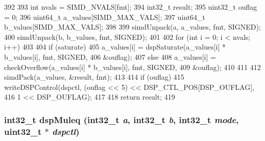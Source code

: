 \begin{DoxyCode}
392 {
393     int nvals = SIMD_NVALS[fmt];
394     int32_t result;
395     uint32_t ouflag = 0;
396     uint64_t a_values[SIMD_MAX_VALS];
397     uint64_t b_values[SIMD_MAX_VALS];
398 
399     simdUnpack(a, a_values, fmt, SIGNED);
400     simdUnpack(b, b_values, fmt, SIGNED);
401 
402     for (int i = 0; i < nvals; i++)
403     {
404         if (saturate)
405             a_values[i] = dspSaturate(a_values[i] * b_values[i], fmt, SIGNED,
406                                       &ouflag);
407         else
408             a_values[i] = checkOverflow(a_values[i] * b_values[i], fmt, SIGNED,
409                                         &ouflag);
410     }
411 
412     simdPack(a_values, &result, fmt);
413 
414     if (ouflag)
415         writeDSPControl(dspctl, (ouflag << 5) << DSP_CTL_POS[DSP_OUFLAG],
416                         1 << DSP_OUFLAG);
417 
418     return result;
419 }
\end{DoxyCode}
\hypertarget{namespaceMipsISA_a1c1ae7be51569f81566b140606caa2bd}{
\subsubsection[{dspMuleq}]{\setlength{\rightskip}{0pt plus 5cm}int32\_\-t dspMuleq (int32\_\-t {\em a}, \/  int32\_\-t {\em b}, \/  int32\_\-t {\em mode}, \/  {\bf uint32\_\-t} $\ast$ {\em dspctl})}}
\label{namespaceMipsISA_a1c1ae7be51569f81566b140606caa2bd}



